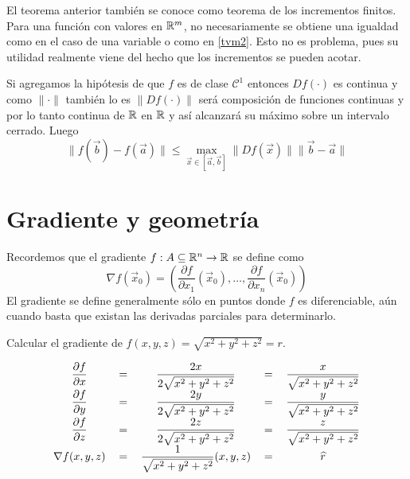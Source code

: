 \begin{nota} 
El teorema anterior tambi\'en se conoce como teorema de los incrementos finitos. Para una funci\'on con valores en $\mathbb{R}^m$, no necesariamente se obtiene una igualdad como en el caso de una variable
o como en \eqref{tvm2}. Esto no es problema, pues su utilidad realmente viene del hecho
que los incrementos se pueden acotar.

Si agregamos la hip\'otesis de que $f$ es de clase $\mathcal{C}^1$ entonces $Df(\cdot)$ 
es continua y como $ \|\cdot\|$ tambi\'en lo es $\|Df(\cdot)\|$ ser\'a 
composici\'on de funciones continuas y por lo tanto continua de $\mathbb{R}$ en $\mathbb{R}$ 
y as\'i alcanzar\'a su m\'aximo sobre un intervalo cerrado. Luego
$$\|f(\vec{b})-f(\vec{a})\|\leq \max_{\vec{x}\in [\vec{a},\vec{b}]}\|Df(\vec{x})\|\|\vec{b}-\vec{a}\|$$
\end{nota}

\section{Gradiente y geometr\'ia}

Recordemos que el gradiente $ f:A\subseteq \mathbb{R}^n\rightarrow\mathbb{R} $
se define como
\[ \nabla f(\vec{x}_0)=\left(\frac{\partial f}{\partial x_1}(\vec{x}_0),\ldots ,\frac{\partial f}{\partial
x_n}(\vec{x}_0)\right) \]
El gradiente se define generalmente s\'olo en
puntos donde $ f $ es diferenciable, a\'un cuando basta que
existan las derivadas parciales para determinarlo.

\begin{ejemplo} 
Calcular el gradiente de $f(x,y,z) = \sqrt{x^2+y^2+z^2} = r$.

\begin{solucion}
\begin{equation*}
\begin{tabular}{ccccc}
$\displaystyle \frac{\partial f}{\partial x}$ & $=$ & $\displaystyle \frac{2x}{2 \sqrt{x^2+y^2+z^2}} 	$ & $=$ & $\displaystyle \frac{x}{\sqrt{x^2+y^2+z^2}}$ \\
$\displaystyle \frac{\partial f}{\partial y}$ & $=$ & $\displaystyle \frac{2y}{2 \sqrt{x^2+y^2+z^2}} 	$ & $=$ & $\displaystyle \frac{y}{\sqrt{x^2+y^2+z^2}}$ \\
$\displaystyle \frac{\partial f}{\partial z}$ & $=$ & $\displaystyle \frac{2z}{2 \sqrt{x^2+y^2+z^2}} 	$ & $=$ & $\displaystyle \frac{z}{\sqrt{x^2+y^2+z^2}}$ \\
$\nabla f(x,y,z)              $ 			  & $=$ & $\displaystyle \frac{1}{\sqrt{x^2+y^2+z^2}}(x,y,z)$ & $=$ & $\widehat{r}$
\end{tabular}
\end{equation*}
\end{solucion}
\end{ejemplo}

